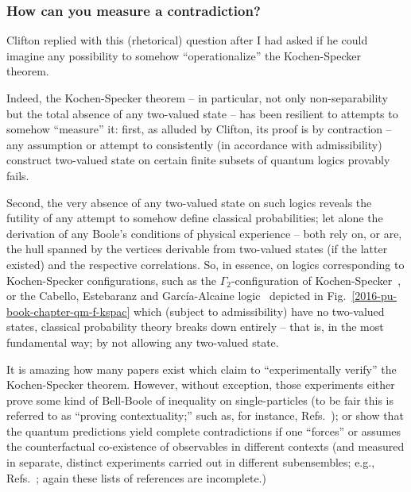 \documentclass[%
  twocolumn,
 showpacs,
 showkeys,
 preprintnumbers,
 amsmath,amssymb,
 aps,
  pra,
  longbibliography,
 floatfix,
 ]{revtex4-1}
\begin{document}
\subsubsection{How can you measure a contradiction?}

Clifton replied with this (rhetorical) question
after I had asked if he could imagine any possibility to somehow ``operationalize'' the Kochen-Specker theorem.

Indeed, the Kochen-Specker theorem -- in particular, not only non-separability but the total absence of any two-valued state --
has been resilient to attempts to somehow ``measure'' it:
first, as alluded by Clifton, its proof is by contraction --
any assumption or attempt to consistently (in accordance with admissibility)
construct two-valued state on certain finite subsets of quantum logics provably fails.

Second, the very absence of any two-valued state on such logics reveals the futility of any attempt to somehow define classical probabilities;
let alone the derivation of any Boole's conditions of physical experience --
both rely on, or are,  the hull spanned by the vertices derivable from two-valued states (if the latter existed) and the respective correlations.
So, in essence, on logics corresponding to Kochen-Specker configurations, such as
the $\Gamma_2$-configuration of Kochen-Specker~\cite[p.~69]{kochen1}, or
the Cabello, Estebaranz and Garc{\'{i}}a-Alcaine logic~\cite{cabello-96,cabello-99}
depicted in Fig.~\ref{2016-pu-book-chapter-qm-f-kspac}
which (subject to admissibility) have no two-valued states,
classical probability theory breaks down entirely -- that is, in the most fundamental way;
by not allowing any two-valued state.



It is amazing how many papers exist which claim to ``experimentally verify'' the Kochen-Specker theorem.
However, without exception, those experiments either prove some kind of Bell-Boole of inequality
on single-particles (to be fair this is referred to as ``proving contextuality;''
such as, for instance, Refs.~\cite{Hasegawa-2003,hasegawa:230401,cabelloFilipp-2008,Bartosik-09,kirch-09});
or show that the quantum predictions yield complete contradictions if  one ``forces'' or assumes the counterfactual
co-existence of
observables in different contexts (and measured in separate, distinct experiments carried out in different subensembles; e.g.,
Refs.~\cite{ghz,cabello-99,Si-Zu-Wein-Ze-2000,panbdwz,simon-2002};
again these lists of references are incomplete.)
\end{document}
